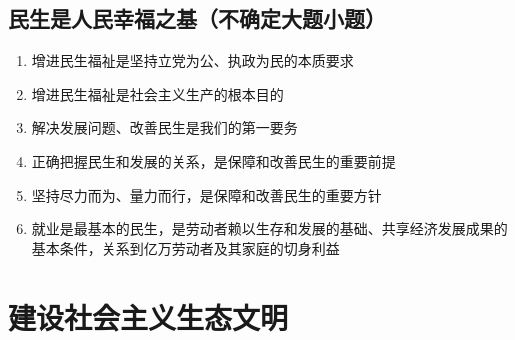 \documentclass{ctexart}
\numberwithin{figure}{section}
\numberwithin{equation}{section}
\begin{document}
    \subsection{民生是人民幸福之基（不确定大题小题）}
    \begin{enumerate}
        \item 增进民生福祉是坚持立党为公、执政为民的本质要求
        \item 增进民生福祉是社会主义生产的根本目的
        \item 解决发展问题、改善民生是我们的第一要务
        \item 正确把握民生和发展的关系，是保障和改善民生的重要前提
        \item 坚持尽力而为、量力而行，是保障和改善民生的重要方针
        \item 就业是最基本的民生，是劳动者赖以生存和发展的基础、共享经济发展成果的基本条件，关系到亿万劳动者及其家庭的切身利益
    \end{enumerate}
\section{建设社会主义生态文明}
\end{document}
